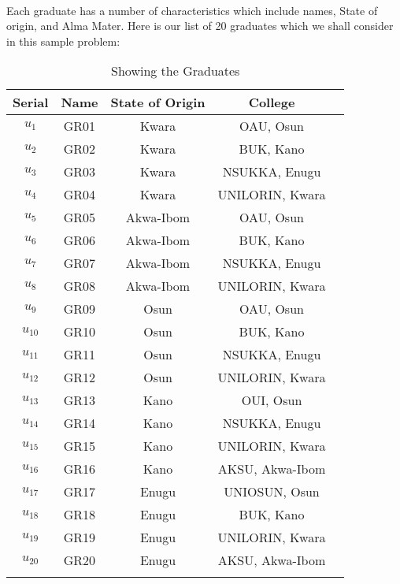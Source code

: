 \documentclass[a4paper,openany]{book}
\begin{document}
			\paragraph{}
				Each graduate has a number of characteristics which include names, State of origin, and Alma Mater. Here is our list of 20 graduates which we shall consider in this sample problem:
				\begin{longtable}{|c|c|c|c|c|}
					\hline
					\textbf{Serial} & \textbf{Name} & \textbf{State of Origin} & \textbf{College} \\
					\hline
					\endhead
					$u_{1}$ & GR01 & Kwara & OAU, Osun\\
					\hline
					$u_{2}$ & GR02 & Kwara & BUK, Kano\\
					\hline
					$u_{3}$ & GR03 & Kwara & NSUKKA, Enugu\\
					\hline
					$u_{4}$ & GR04 & Kwara & UNILORIN, Kwara\\
					\hline
					$u_{5}$ & GR05 & Akwa-Ibom & OAU, Osun\\
					\hline
					$u_{6}$ & GR06 & Akwa-Ibom & BUK, Kano\\
					\hline
					$u_{7}$ & GR07 & Akwa-Ibom & NSUKKA, Enugu\\
					\hline
					$u_{8}$ & GR08 & Akwa-Ibom & UNILORIN, Kwara\\
					\hline
					$u_{9}$ & GR09 & Osun & OAU, Osun\\
					\hline
					$u_{10}$ & GR10 & Osun & BUK, Kano\\
					\hline
					$u_{11}$ & GR11 & Osun & NSUKKA, Enugu\\
					\hline
					$u_{12}$ & GR12 & Osun & UNILORIN, Kwara\\
					\hline
					$u_{13}$ & GR13 & Kano & OUI, Osun\\
					\hline
					$u_{14}$ & GR14 & Kano & NSUKKA, Enugu\\
					\hline
					$u_{15}$ & GR15 & Kano & UNILORIN, Kwara \\
					\hline
					$u_{16}$ & GR16 & Kano & AKSU, Akwa-Ibom\\
					\hline
					$u_{17}$ & GR17 & Enugu & UNIOSUN, Osun\\
					\hline
					$u_{18}$ & GR18 & Enugu & BUK, Kano\\
					\hline
					$u_{19}$ & GR19 & Enugu & UNILORIN, Kwara\\
					\hline
					$u_{20}$ & GR20 & Enugu & AKSU, Akwa-Ibom\\
					\hline
					\caption{Showing the Graduates\label{ex:tablex}}
				\end{longtable}	
\end{document}
